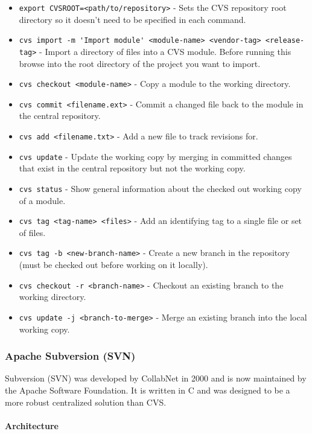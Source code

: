 \begin{itemize}
    \item \lstinline{export CVSROOT=<path/to/repository>} - Sets the CVS repository root directory so it doesn't need to be specified in each command.
    \item \lstinline{cvs import -m 'Import module' <module-name> <vendor-tag> <release-tag>} - Import a directory of files into a CVS module. Before running this browse into the root directory of the project you want to import.
    \item \lstinline{cvs checkout <module-name>} - Copy a module to the working directory.
    \item \lstinline{cvs commit <filename.ext>} - Commit a changed file back to the module in the central repository.
    \item \lstinline{cvs add <filename.txt>} - Add a new file to track revisions for.
    \item \lstinline{cvs update} - Update the working copy by merging in committed changes that exist in the central repository but not the working copy.
    \item \lstinline{cvs status} - Show general information about the checked out working copy of a module.
    \item \lstinline{cvs tag <tag-name> <files>} - Add an identifying tag to a single file or set of files.
    \item \lstinline{cvs tag -b <new-branch-name>} - Create a new branch in the repository (must be checked out before working on it locally).
    \item \lstinline{cvs checkout -r <branch-name>} - Checkout an existing branch to the working directory.
    \item \lstinline{cvs update -j <branch-to-merge>} - Merge an existing branch into the local working copy.
\end{itemize}

\subsubsection{Apache Subversion (SVN)}
Subversion (SVN) was developed by CollabNet in 2000 and is now maintained by the Apache Software Foundation. It is written in C and was designed to be a more robust centralized solution than CVS.
\paragraph{Architecture}

